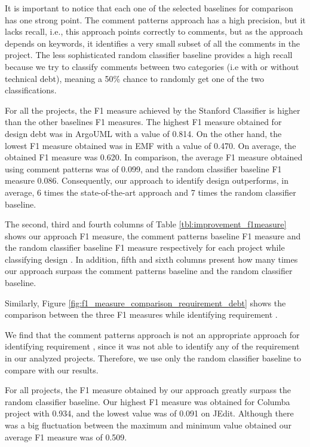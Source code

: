 It is important to notice that each one of the selected baselines for comparison has one strong point. The comment patterns approach has a high precision, but it lacks recall, i.e., this approach points correctly to \SATD comments, but as the approach depends on keywords, it identifies a very small subset of all the \SATD comments in the project. The less sophisticated random classifier baseline provides a high recall because we try to classify comments between two categories (i.e with or without technical debt), meaning a 50\% chance to randomly get one of the two classifications. 

For all the projects, the F1 measure achieved by the Stanford Classifier is higher than the other baselines F1 measures. The highest F1 measure obtained for design debt was in ArgoUML with a value of 0.814. On the other hand, the lowest F1 measure obtained was in EMF with a value of 0.470. On average, the obtained F1 measure was 0.620. In comparison, the average F1 measure obtained using comment patterns was of 0.099, and the random classifier baseline F1 measure 0.086. Consequently, our approach to identify design \SATD outperforms, in average, 6 times the state-of-the-art approach and 7 times the random classifier baseline. 

The second, third and fourth columns of Table \ref{tbl:improvement_f1measure} shows our approach F1 measure, the comment patterns baseline F1 measure and the random classifier baseline F1 measure respectively for each project while classifying design \SATD. In addition, fifth and sixth columns present how many times our approach surpass the comment patterns baseline and the random classifier baseline.   
 
Similarly, Figure \ref{fig:f1_measure_comparison_requirement_debt} shows the comparison between the three F1 measures while identifying requirement \SATD.

We find that the comment patterns approach is not an appropriate approach for identifying requirement \SATD, since it was not able to identify any of the requirement \SATD in our analyzed projects. Therefore, we use only the random classifier baseline to compare with our results.

For all projects, the F1 measure obtained by our approach greatly surpass the random classifier baseline. Our highest F1 measure was obtained for Columba project with 0.934, and the lowest value was of 0.091 on JEdit. Although there was a big fluctuation between the maximum and minimum value obtained our average F1 measure was of 0.509. 

